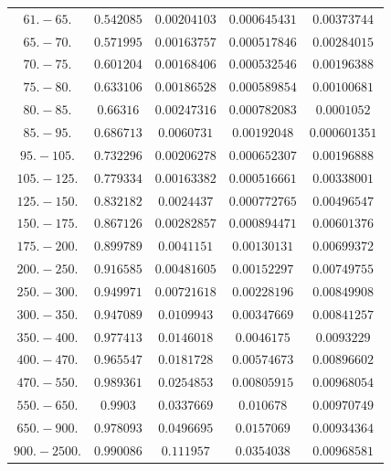 \documentclass[11pt]{article}
\begin{document}
\begin{table}[htbp]
{\begin{tabular}{ccccc}
        $61.-65.$ & $0.542085$ & $0.00204103$ & $0.000645431$ & $0.00373744$ \\
        $65.-70.$ & $0.571995$ & $0.00163757$ & $0.000517846$ & $0.00284015$ \\
        $70.-75.$ & $0.601204$ & $0.00168406$ & $0.000532546$ & $0.00196388$ \\
        $75.-80.$ & $0.633106$ & $0.00186528$ & $0.000589854$ & $0.00100681$ \\
        $80.-85.$ & $0.66316$ & $0.00247316$ & $0.000782083$ & $0.0001052$ \\
        $85.-95.$ & $0.686713$ & $0.0060731$ & $0.00192048$ & $0.000601351$ \\
        $95.-105.$ & $0.732296$ & $0.00206278$ & $0.000652307$ & $0.00196888$ \\
        $105.-125.$ & $0.779334$ & $0.00163382$ & $0.000516661$ & $0.00338001$ \\
        $125.-150.$ & $0.832182$ & $0.0024437$ & $0.000772765$ & $0.00496547$ \\
        $150.-175.$ & $0.867126$ & $0.00282857$ & $0.000894471$ & $0.00601376$ \\
        $175.-200.$ & $0.899789$ & $0.0041151$ & $0.00130131$ & $0.00699372$ \\
        $200.-250.$ & $0.916585$ & $0.00481605$ & $0.00152297$ & $0.00749755$ \\
        $250.-300.$ & $0.949971$ & $0.00721618$ & $0.00228196$ & $0.00849908$ \\
        $300.-350.$ & $0.947089$ & $0.0109943$ & $0.00347669$ & $0.00841257$ \\
        $350.-400.$ & $0.977413$ & $0.0146018$ & $0.0046175$ & $0.0093229$ \\
        $400.-470.$ & $0.965547$ & $0.0181728$ & $0.00574673$ & $0.00896602$ \\
        $470.-550.$ & $0.989361$ & $0.0254853$ & $0.00805915$ & $0.00968054$ \\
        $550.-650.$ & $0.9903$ & $0.0337669$ & $0.010678$ & $0.00970749$ \\
        $650.-900.$ & $0.978093$ & $0.0496695$ & $0.0157069$ & $0.00934364$ \\
        $900.-2500.$ & $0.990086$ & $0.111957$ & $0.0354038$ & $0.00968581$ \\
	\bottomrule
	\end{tabular}
}
\end{table}
\end{document}
